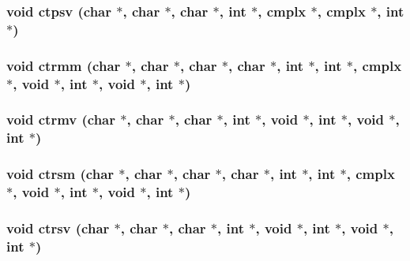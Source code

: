 \subsubsection{\setlength{\rightskip}{0pt plus 5cm}void ctpsv (char $\ast$, char $\ast$, char $\ast$, int $\ast$, {\bf cmplx} $\ast$, {\bf cmplx} $\ast$, int $\ast$)}\label{essl_8h_3e22f3c68e6365b526a8236487ca96c7}


\subsubsection{\setlength{\rightskip}{0pt plus 5cm}void ctrmm (char $\ast$, char $\ast$, char $\ast$, char $\ast$, int $\ast$, int $\ast$, {\bf cmplx} $\ast$, void $\ast$, int $\ast$, void $\ast$, int $\ast$)}\label{essl_8h_a377e180648f11960ceaca7fdba17611}


\subsubsection{\setlength{\rightskip}{0pt plus 5cm}void ctrmv (char $\ast$, char $\ast$, char $\ast$, int $\ast$, void $\ast$, int $\ast$, void $\ast$, int $\ast$)}\label{essl_8h_bb288aeaaed371d82707e17f8440b14a}


\subsubsection{\setlength{\rightskip}{0pt plus 5cm}void ctrsm (char $\ast$, char $\ast$, char $\ast$, char $\ast$, int $\ast$, int $\ast$, {\bf cmplx} $\ast$, void $\ast$, int $\ast$, void $\ast$, int $\ast$)}\label{essl_8h_ae008e3594da61f0ca406115062421f5}


\subsubsection{\setlength{\rightskip}{0pt plus 5cm}void ctrsv (char $\ast$, char $\ast$, char $\ast$, int $\ast$, void $\ast$, int $\ast$, void $\ast$, int $\ast$)}\label{essl_8h_d5842b534dc895571ebda71894f289d6}


